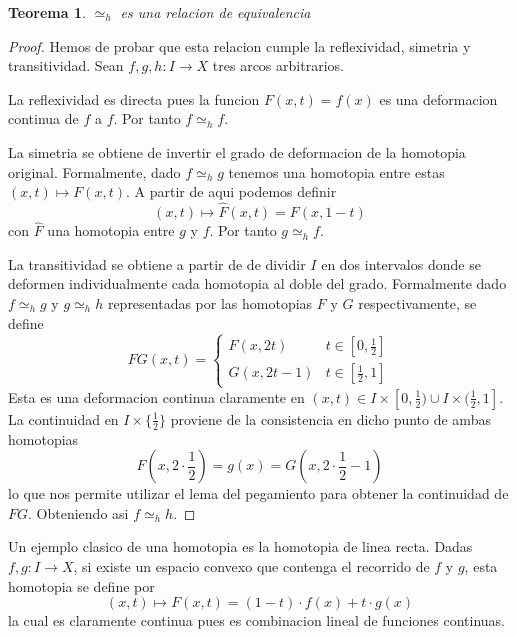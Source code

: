 \documentclass[letterpaper]{article}
\theoremstyle{definition}
\theoremstyle{plain}
\newtheorem{teorema}{Teorema}
\theoremstyle{plain}
\theoremstyle{remark}
\begin{document}
\begin{teorema}
  \(\simeq_h\) es una relacion de equivalencia
\end{teorema}
\begin{proof}
  Hemos de probar que esta relacion cumple la reflexividad, simetria y
  transitividad. Sean \(f,g,h : I \to X\) tres arcos arbitrarios.

  La reflexividad es directa pues la funcion \(F(x,t) = f(x)\) es una
  deformacion continua de \(f\) a \(f\). Por tanto \(f \simeq_h f\).

  La simetria se obtiene de invertir el grado de deformacion de la
  homotopia original. Formalmente, dado \(f \simeq_h g\) tenemos una
  homotopia entre estas \((x,t) \mapsto F(x,t)\). A partir de aqui
  podemos definir
  \begin{equation}
    \label{eq:homotopy-simetry}
    (x,t) \mapsto \hat{F}(x,t) = F(x,1-t)
  \end{equation}
  con \(\hat{F}\) una homotopia entre \(g\) y \(f\). Por tanto \(g
  \simeq_h f\).

  La transitividad se obtiene a partir de de dividir \(I\) en dos
  intervalos donde se deformen individualmente cada homotopia al doble
  del grado. Formalmente dado \(f \simeq_h g\) y \(g \simeq_h h\)
  representadas por las homotopias \(F\) y \(G\) respectivamente, se define
  \[ FG(x,t) = \begin{cases}
                 F(x,2t) & t \in [0,\frac{1}{2}] \\
                 G(x,2t - 1) & t \in [ \frac{1}{2} , 1]
               \end{cases}
  \]
  Esta es una deformacion continua claramente en \((x,t) \in I \times [0,
  \frac{1}{2}) \cup I \times (\frac{1}{2}, 1]\). La continuidad en \(I
  \times \{\frac{1}{2}\}\) proviene de la consistencia en dicho punto de
  ambas homotopias
  \[ F(x,2 \cdot \frac{1}{2}) = g(x) = G(x, 2 \cdot \frac{1}{2} - 1)\]
  lo que nos permite utilizar el lema del pegamiento para obtener la
  continuidad de \(FG\). Obteniendo asi \(f \simeq_h h\).
\end{proof}

Un ejemplo clasico de una homotopia es la homotopia de linea recta. Dadas
\(f,g : I \to X\), si existe un espacio convexo que contenga el recorrido
de \(f\) y \(g\), esta homotopia se define por
\[ (x,t) \mapsto F(x,t) = (1-t) \cdot f(x) + t \cdot g(x) \]
la cual es claramente continua pues es combinacion lineal de funciones continuas.
\end{document}
